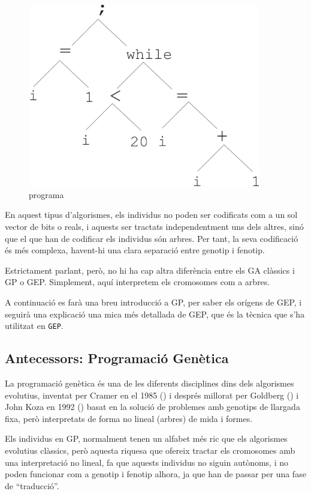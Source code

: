 \begin{figure} \centering \includegraphics[width=4in]{intro/6-3.jpg}
\caption{\label{fig:6-3}programa}
\end{figure}

En aquest tipus d'algorismes, els individus no poden ser codificats com a un
sol vector de bits o reals, i aquests ser tractats independentment uns dels
altres, sinó que el que han de codificar els individus són arbres.  Per tant,
la seva codificació és més complexa, havent-hi una clara separació entre genotip
i fenotip.

Estrictament parlant, però, no hi ha cap altra diferència entre els GA clàssics
i GP o GEP.  Simplement, aquí interpretem els cromosomes com a arbres.

A continuació es farà una breu introducció a GP, per saber els orígens de
GEP, i seguirà una explicació una mica més detallada de GEP, que és la tècnica
que s'ha utilitzat en \texttt{GEP}.

\subsection{Antecessors: Programació Genètica} %
\label{sub:Ant. Programacio Genetica}
La programació genètica és una de les diferents disciplines dins dels algorismes
evolutius, inventat per Cramer en el 1985 (\cite{C85}) i després millorat per
Goldberg (\cite{Goldberg:89}) i
John Koza en 1992 (\cite{koza:92}) basat en la solució de problemes amb genotips de
llargada fixa, però interpretats de forma no lineal (arbres) de mida i formes.

Els individus en GP, normalment tenen un alfabet més ric que els algorismes
evolutius clàssics, però aquesta riquesa que ofereix tractar els cromosomes amb
una interpretació no lineal, fa que aquests individus no siguin autònoms, i no
poden funcionar com a genotip i fenotip alhora, ja que han de passar per una
fase de ``traducció''.

